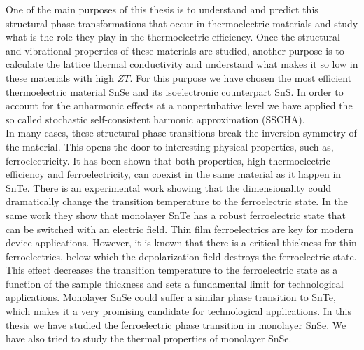 One of the main purposes of this thesis is to understand and predict this structural phase transformations that occur 
in thermoelectric materials and study what is the role they play in the thermoelectric efficiency. Once the 
structural and vibrational properties of these materials are studied, another purpose is to calculate the lattice 
thermal conductivity and understand what makes it so low in these materials with high $ZT$. For this purpose we have 
chosen the most efficient thermoelectric material SnSe and its isoelectronic counterpart SnS. In order to account 
for the anharmonic effects at a nonpertubative level we have applied the so called stochastic self-consistent 
harmonic approximation\cite{errea2013first,errea2014anharmonic,bianco2017second,monacelli2018pressure} (SSCHA). \\

In many cases, these structural phase transitions break the inversion symmetry of the 
material\cite{ribeiro2018strong,chang2016discovery}. This opens the door to interesting physical properties, such 
as, ferroelectricity. It has been shown that both properties, high thermoelectric efficiency and ferroelectricity, 
can coexist in the same material as it happen in SnTe\cite{ribeiro2018strong,zhang2013high}. There is an 
experimental work\cite{chang2016discovery} showing that the dimensionality could dramatically change the transition 
temperature to the ferroelectric state. In the same work\cite{chang2016discovery} they show that 
monolayer SnTe has a robust ferroelectric state that can be switched with an electric field. Thin film ferroelectrics 
are key for modern device applications\cite{lallart2011ferroelectrics}. However, it is known that there is a critical 
thickness for thin ferroelectrics, below which the depolarization field destroys the ferroelectric 
state\cite{batra1973new,zhong1994giant,dawber2005physics}. This effect decreases the transition temperature to the 
ferroelectric state as a function of the sample thickness\cite{fong2004ferroelectricity,fong2006stabilization} and 
sets a fundamental limit for technological applications. Monolayer SnSe could suffer a similar phase transition to 
SnTe, which makes it a very promising candidate for technological applications. In this thesis we have studied 
the ferroelectric phase transition in monolayer SnSe\cite{chang2020controlled}. We have also tried to study the 
thermal properties of monolayer SnSe. \\

